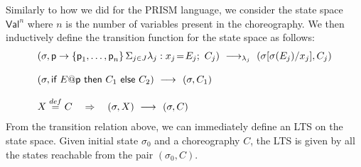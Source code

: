  Similarly to how we did for the PRISM language, we
consider the state space $\mathsf{Val}^n$ where $n$ is the number of
variables present in the choreography. We then inductively define the
transition function for the state space as follows: 
\begin{displaymath}
  \begin{array}{lllll}
    (\sigma, \interact{p}{\role p_1,\ldots,\role p_n}) 
    \red{\lambda_j}
    (\sigma[\sigma(E_j)/x_j], C_j) 
    \\\\
    (\sigma,\ifTE {E}{p}{C_1}{C_2}) 
    \red{}
    (\sigma, C_1)
    \\\\
    X\stackrel{\mathsf{def}}{=} C \quad\Rightarrow\quad (\sigma, X) \red{}(\sigma,C)
  \end{array}
\end{displaymath}
From the transition relation above, we can immediately define an LTS
on the state space. Given initial state $\sigma_0$ and a choreography
$C$, the LTS is given by all the states reachable from the pair
$(\sigma_0,C)$.




